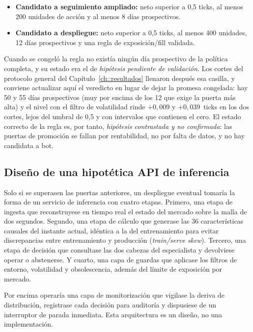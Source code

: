 \begin{itemize}[noitemsep]
  \item \textbf{Candidato a seguimiento ampliado:} neto superior a 0,5 ticks, al menos 200
  unidades de acción y al menos 8 días prospectivos.
  \item \textbf{Candidato a despliegue:} neto superior a 0,5 ticks, al menos 400 unidades,
  12 días prospectivos y una regla de exposición/fill validada.
\end{itemize}

Cuando se congeló la regla no existía ningún día prospectivo de la política completa, y su
estado era el de \emph{hipótesis pendiente de validación}. Los cortes del protocolo general
del Capítulo~\ref{ch::resultados} llenaron después esa casilla, y conviene actualizar aquí
el veredicto en lugar de dejar la promesa congelada: hay 50 y 55 días prospectivos (muy por
encima de los 12 que exige la puerta más alta) y el nivel con el filtro de volatilidad rinde
$+0{,}009$ y $+0{,}039$~ticks en los dos cortes, lejos del umbral de 0,5 y con intervalos
que contienen el cero. El estado correcto de la regla es, por tanto, \emph{hipótesis
contrastada y no confirmada}: las puertas de promoción se fallan por rentabilidad, no por
falta de datos, y no hay candidata a bot.

\subsection{Diseño de una hipotética API de inferencia}

Solo si se superasen las puertas anteriores, un despliegue eventual tomaría la forma de un
servicio de inferencia con cuatro etapas. Primero, una etapa de ingesta que reconstruyese en
tiempo real el estado del mercado sobre la malla de dos segundos. Segundo, una etapa de
cálculo que generase las 36 características causales del instante actual, idéntica a la del
entrenamiento para evitar discrepancias entre entrenamiento y producción
(\emph{train/serve skew}). Tercero, una etapa de decisión que consultase las dos cabezas del
especialista y devolviese operar o abstenerse. Y cuarto, una capa de guardas que aplicase los
filtros de entorno, volatilidad y obsolescencia, además del límite de exposición por mercado.

Por encima operaría una capa de monitorización que vigilase la deriva de distribución,
registrase cada decisión para auditoría y dispusiese de un interruptor de parada inmediata.
Esta arquitectura es un diseño, no una implementación.

